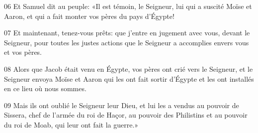 
06 Et Samuel dit au peuple: «Il est témoin, le Seigneur, lui qui a suscité Moïse et Aaron, et qui a fait monter vos pères du pays d’Égypte!

07 Et maintenant, tenez-vous prêts: que j’entre en jugement avec vous, devant le Seigneur, pour toutes les justes actions que le Seigneur a accomplies envers vous et vos pères.

08 Alors que Jacob était venu en Égypte, vos pères ont crié vers le Seigneur, et le Seigneur envoya Moïse et Aaron qui les ont fait sortir d’Égypte et les ont installés en ce lieu où nous sommes.

09 Mais ils ont oublié le Seigneur leur Dieu, et lui les a vendus au pouvoir de Sissera, chef de l’armée du roi de Haçor, au pouvoir des Philistins et au pouvoir du roi de Moab, qui leur ont fait la guerre.»
